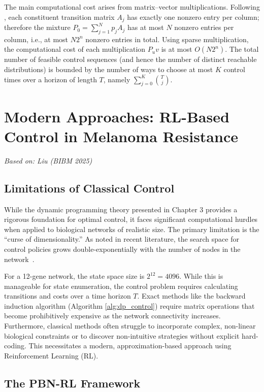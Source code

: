 \documentclass[12pt, a4paper]{report}
\begin{document}
The main computational cost arises from matrix--vector multiplications. Following \cite{ching2009optimal}, each constituent transition matrix $A_j$ has exactly one nonzero entry per column; therefore the mixture $P_0=\sum_{j=1}^{N} p_j A_j$ has at most $N$ nonzero entries per column, i.e., at most $N2^n$ nonzero entries in total. Using sparse multiplication, the computational cost of each multiplication $P_u v$ is at most $O(N2^n)$. The total number of feasible control sequences (and hence the number of distinct reachable distributions) is bounded by the number of ways to choose at most $K$ control times over a horizon of length $T$, namely $\sum_{j=0}^{K} \binom{T}{j}$.
	

	\chapter{Modern Approaches: RL-Based Control in Melanoma Resistance}
	\label{chap:rl_control}
	
	\textit{Based on: Liu (BIBM 2025)~\cite{liu2025melanoma}}
	
	\section{Limitations of Classical Control}
	While the dynamic programming theory presented in Chapter 3 provides a rigorous foundation for optimal control, it faces significant computational hurdles when applied to biological networks of realistic size. The primary limitation is the ``curse of dimensionality.'' As noted in recent literature, the search space for control policies grows double-exponentially with the number of nodes in the network~\cite{liu2025melanoma}.
	
	For a 12-gene network, the state space size is $2^{12} = 4096$. While this is manageable for state enumeration, the control problem requires calculating transitions and costs over a time horizon $T$. Exact methods like the backward induction algorithm (Algorithm \ref{alg:dp_control}) require matrix operations that become prohibitively expensive as the network connectivity increases. Furthermore, classical methods often struggle to incorporate complex, non-linear biological constraints or to discover non-intuitive strategies without explicit hard-coding. This necessitates a modern, approximation-based approach using Reinforcement Learning (RL).
	
\section{The PBN-RL Framework}
\end{document}
